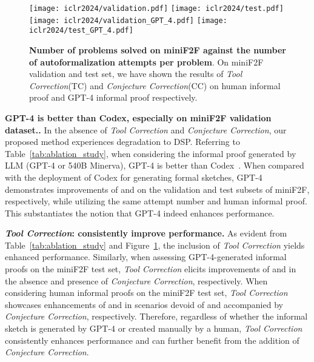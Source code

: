 \documentclass{article} \usepackage{iclr2024_conference,times}
\def\methodOne{TC\xspace}
\def\methodOneFull{\textit{Tool Correction}\xspace}
\def\methodTwo{CC\xspace}
\def\methodTwoFull{\textit{Conjecture Correction}\xspace}
\begin{document}
\begin{figure}[t]
\setlength{\abovecaptionskip}{0.1cm}
\centering
\texttt{[image: iclr2024/validation.pdf]}
\hspace{0in}
\texttt{[image: iclr2024/test.pdf]}
\hspace{0in}
\texttt{[image: iclr2024/validation\_GPT\_4.pdf]}
\hspace{0in}
\texttt{[image: iclr2024/test\_GPT\_4.pdf]}
\caption{
\small
\textbf{Number of problems solved on miniF2F against the number of autoformalization attempts per problem}. On miniF2F validation and test set, we have shown the results of \methodOneFull (\methodOne) and \methodTwoFull (\methodTwo) on human informal proof and GPT-4 informal proof respectively.
}
\label{fig: ablation}
\vspace{-15pt}
\end{figure}
\textbf{GPT-4 is better than Codex, especially on miniF2F validation dataset..} In the absence of \methodOneFull and \methodTwoFull, our proposed method experiences degradation to DSP. Referring to  Table~\ref{tab:ablation_study}, when considering the informal proof generated by LLM (GPT-4 or 540B Minerva), GPT-4 is better than Codex~\citep{chen2021evaluating}. When compared with the deployment of Codex for generating formal sketches, GPT-4 demonstrates improvements of  and  on the validation and test subsets of miniF2F, respectively, while utilizing the same attempt number  and human informal proof. This substantiates the notion that GPT-4 indeed enhances performance. 

\textbf{\methodOneFull: consistently improve performance.} As evident from Table~\ref{tab:ablation_study} and Figure~\ref{fig: ablation}, the inclusion of \methodOneFull yields enhanced performance. Similarly,  when assessing GPT-4-generated informal proofs on the miniF2F test set, \methodOneFull elicits improvements of  and  in the absence and presence of \methodTwoFull, respectively. When considering human informal proofs on the miniF2F test set, \methodOneFull showcases enhancements of  and  in scenarios devoid of and accompanied by \methodTwoFull, respectively. Therefore, regardless of whether the informal sketch is generated by GPT-4 or created manually by a human, \methodOneFull consistently enhances performance and can further benefit from the addition of \methodTwoFull.
\end{document}
